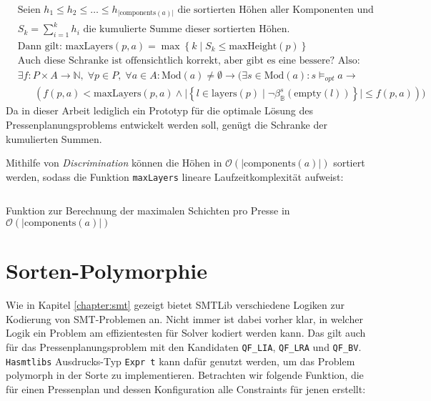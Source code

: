 \begin{align*}
    &\hspace{0pt}\text{Seien } h_1 \leq h_2 \leq \ldots \leq h_{\lvert \text{components}(a)\rvert} \text{ die sortierten Höhen aller Komponenten und} \\
    &\hspace{0pt}S_k = \sum_{i = 1}^{k} h_i \text{ die kumulierte Summe dieser sortierten Höhen.} \\
    &\hspace{0pt}\text{Dann gilt: } \text{maxLayers}(p,a) = \max\left\{ k \mid S_k \leq \text{maxHeight}(p) \right\} \\
    &\hspace{0pt}\text{Auch diese Schranke ist offensichtlich korrekt, aber gibt es eine bessere? Also:} \\
    &\hspace{0pt}\exists f: P \times A \rightarrow \mathbb{N}, \; \forall p \in P, \; \forall a \in A: \text{Mod}(a) \neq \emptyset \rightarrow (\exists s \in \text{Mod}(a): s \models_{opt} a \rightarrow \\
    &\hspace{20pt}\left(f(p,a) < \text{maxLayers}(p,a) \land \lvert \left\{ l \in \text{layers}(p) \mid \neg \beta_{\mathbb{B}}^{s}(\text{empty}(l)) \right\} \rvert \leq f(p,a) \right))
\end{align*}
Da in dieser Arbeit lediglich ein Prototyp für die optimale Lösung des Pressenplanungsproblems entwickelt werden soll, genügt die Schranke der kumulierten Summen.

Mithilfe von \textit{Discrimination} \cite{discriminationPaper, discriminationHaskell} können die Höhen in $\mathcal{O}(\lvert \text{components}(a) \rvert)$ sortiert werden,
sodass die Funktion \texttt{maxLayers} lineare Laufzeitkomplexität aufweist:

\begin{listing}[H]
    \inputminted[linenos=true]{haskell}{Code/Implementierung/MaxLayers.hs}
    \caption{Funktion zur Berechnung der maximalen Schichten pro Presse in $\mathcal{O}(\lvert \text{components}(a) \rvert)$}
    \label{listing:maxlayersimpl}
\end{listing}

\section{Sorten-Polymorphie}
\label{sec:sortpoly}
Wie in Kapitel \ref{chapter:smt} gezeigt bietet SMTLib verschiedene Logiken zur Kodierung von SMT-Problemen an.
Nicht immer ist dabei vorher klar, in welcher Logik ein Problem am effizientesten für Solver kodiert werden kann.
Das gilt auch für das Pressenplanungsproblem mit den Kandidaten \texttt{QF\_LIA}, \texttt{QF\_LRA} und \texttt{QF\_BV}.
\texttt{Hasmtlibs} Ausdrucks-Typ \texttt{Expr t} kann dafür genutzt werden, um das Problem polymorph in der Sorte zu implementieren.
Betrachten wir folgende Funktion, die für einen Pressenplan und dessen Konfiguration alle Constraints für jenen erstellt:

